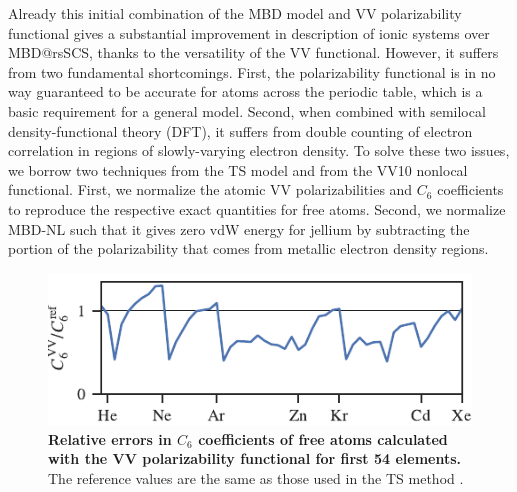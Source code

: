 Already this initial combination of the MBD model and VV polarizability functional gives a substantial improvement in description of ionic systems over MBD@rsSCS, thanks to the versatility of the VV functional.
However, it suffers from two fundamental shortcomings.
First, the polarizability functional is in no way guaranteed to be accurate for atoms across the periodic table, which is a basic requirement for a general model.
Second, when combined with semilocal density-functional theory (DFT), it suffers from double counting of electron correlation in regions of slowly-varying electron density.
To solve these two issues, we borrow two techniques from the TS model and from the VV10 nonlocal functional.
First, we normalize the atomic VV polarizabilities and $C_6$ coefficients to reproduce the respective exact quantities for free atoms.
Second, we normalize MBD-NL such that it gives zero vdW energy for jellium by subtracting the portion of the polarizability that comes from metallic electron density regions.


\begin{figure}[t!]
\centering
\includegraphics{../media/vv-periodic-table.pdf}
\caption{%
\textbf{Relative errors in $C_6$ coefficients of free atoms calculated with the VV polarizability functional for first 54 elements.}
The reference values are the same as those used in the TS method \citep{TkatchenkoPRL09}.
}\label{fig:vv-periodic-table}
\end{figure}


